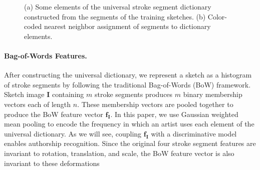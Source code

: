 \begin{figure}[ht]
\centering
{}
\vspace{-3mm}
\caption{(a) Some elements of the universal stroke segment dictionary constructed from the segments of the training sketches. (b) Color-coded nearest neighbor assignment of segments to dictionary elements.}\vspace{-5mm}
\label{fig:bagOfWords}
\end{figure}


\vspace{-2mm}
\paragraph{Bag-of-Words Features.} After constructing the universal dictionary, we represent a sketch as a histogram of stroke segments by following the traditional Bag-of-Words (BoW) framework. Sketch image $\mathbf{I}$ containing $m$ stroke segments produces $m$ binary membership vectors each of length $n$. These membership vectors are pooled together to produce the BoW feature vector $\mathbf{f}_{\mathbf{I}}$. In this paper, we use Gaussian weighted mean pooling to encode the frequency in which an artist uses each element of the universal dictionary. As we will see, coupling $\mathbf{f}_{\mathbf{I}}$ with a discriminative model enables authorship recognition. Since the original four stroke segment features are invariant to rotation, translation, and scale, the BoW feature vector is also invariant to these deformations \cite{lu2007survey}



